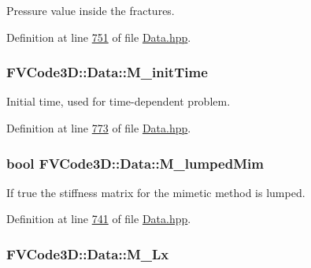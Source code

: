 Pressure value inside the fractures. 



Definition at line \hyperlink{Data_8hpp_source_l00751}{751} of file \hyperlink{Data_8hpp_source}{Data.\+hpp}.

\subsubsection[{\texorpdfstring{M\+\_\+init\+Time}{M_initTime}}]{ F\+V\+Code3\+D\+::\+Data\+::\+M\+\_\+init\+Time\hspace{0.3cm}{\ttfamily [protected]}}\hypertarget{classFVCode3D_1_1Data_ab4a94e00bef44eb2195783ffa4682cf0}{}\label{classFVCode3D_1_1Data_ab4a94e00bef44eb2195783ffa4682cf0}


Initial time, used for time-\/dependent problem. 



Definition at line \hyperlink{Data_8hpp_source_l00773}{773} of file \hyperlink{Data_8hpp_source}{Data.\+hpp}.

\subsubsection[{\texorpdfstring{M\+\_\+lumped\+Mim}{M_lumpedMim}}]{\setlength{\rightskip}{0pt plus 5cm}bool F\+V\+Code3\+D\+::\+Data\+::\+M\+\_\+lumped\+Mim\hspace{0.3cm}{\ttfamily [protected]}}\hypertarget{classFVCode3D_1_1Data_a1eafd426e867afe23097e38c3d28fa2d}{}\label{classFVCode3D_1_1Data_a1eafd426e867afe23097e38c3d28fa2d}


If true the stiffness matrix for the mimetic method is lumped. 



Definition at line \hyperlink{Data_8hpp_source_l00741}{741} of file \hyperlink{Data_8hpp_source}{Data.\+hpp}.

\subsubsection[{\texorpdfstring{M\+\_\+\+Lx}{M_Lx}}]{ F\+V\+Code3\+D\+::\+Data\+::\+M\+\_\+\+Lx\hspace{0.3cm}{\ttfamily [protected]}}\hypertarget{classFVCode3D_1_1Data_ae5452237bcd372f1f58b338eb81c03c9}{}\label{classFVCode3D_1_1Data_ae5452237bcd372f1f58b338eb81c03c9}


